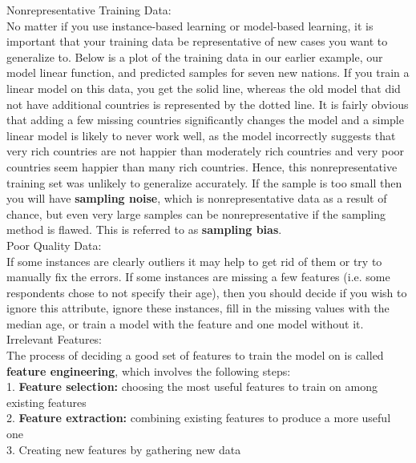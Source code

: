     \noindent Nonrepresentative Training Data: \\
    No matter if you use instance-based learning or model-based learning, it is important that your training
    data be representative of new cases you want to generalize to. Below is a plot of the training data in our
    earlier example, our model linear function, and predicted samples for seven new nations. If you train a
    linear model on this data, you get the solid line, whereas the old model that did not have additional
    countries is represented by the dotted line. It is fairly obvious that adding a few missing countries
    significantly changes the model and a simple linear model is likely to never work well, as the model
    incorrectly suggests that very rich countries are not happier than moderately rich countries and very poor
    countries seem happier than many rich countries. Hence, this nonrepresentative training set was unlikely
    to generalize accurately. If the sample is too small then you will have \textbf{sampling noise}, which is
    nonrepresentative data as a result of chance, but even very large samples can be nonrepresentative if the
    sampling method is flawed. This is referred to as \textbf{sampling bias}. \\

    \noindent Poor Quality Data: \\
    If some instances are clearly outliers it may help to get rid of them or try to manually fix the errors.
    If some instances are missing a few features (i.e. some respondents chose to not specify their age), then
    you should decide if you wish to ignore this attribute, ignore these instances, fill in the missing values
    with the median age, or train a model with the feature and one model without it. \\

    \noindent Irrelevant Features: \\
    The process of deciding a good set of features to train the model on is called
    \textbf{feature engineering}, which involves the following steps: \\
    1. \textbf{Feature selection:} choosing the most useful features to train on among existing features \\
    2. \textbf{Feature extraction:} combining existing features to produce a more useful one \\
    3. Creating new features by gathering new data \\

